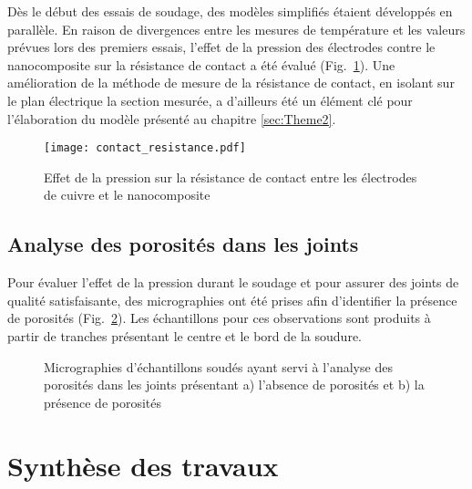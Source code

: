 Dès le début des essais de soudage, des modèles simplifiés étaient développés en parallèle. 
En raison de divergences entre les mesures de température et les valeurs prévues lors des premiers essais, l'effet de la pression des électrodes contre le nanocomposite sur la résistance de contact a été évalué (Fig.~\ref{fig:resistance_contact}). 
Une amélioration de la méthode de mesure de la résistance de contact, en isolant sur le plan électrique la section mesurée, a d'ailleurs été un élément clé pour l'élaboration du modèle présenté au chapitre \ref{sec:Theme2}. 

\begin{figure}[h]
	\centering
	\texttt{[image: contact\_resistance.pdf]}
	\caption{Effet de la pression sur la résistance de contact entre les électrodes de cuivre et le nanocomposite}
	\label{fig:resistance_contact}
\end{figure}

\FloatBarrier
\subsection{Analyse des porosités dans les joints}

Pour évaluer l'effet de la pression durant le soudage et pour assurer des joints de qualité satisfaisante, des micrographies ont été prises afin d'identifier la présence de porosités (Fig.~\ref{fig:micro_analyse_porosite}). 
Les échantillons pour ces observations sont produits à partir de tranches présentant le centre et le bord de la soudure. 

\begin{figure}[h!]
	\centering
	 \qquad
	\caption{Micrographies d'échantillons soudés ayant servi à l'analyse des porosités dans les joints présentant a) l'absence de porosités et b) la présence de porosités}
	\label{fig:micro_analyse_porosite}
\end{figure}

\FloatBarrier
\section{Synthèse des travaux}

